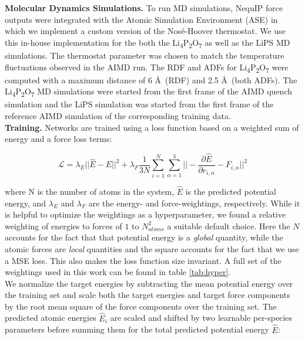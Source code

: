 \documentclass[11pt]{article}
\begin{document}
\textbf{Molecular Dynamics Simulations.} To run MD simulations, NequIP force outputs were integrated with the Atomic Simulation Environment (ASE) \cite{Hjorth_Larsen_2017} in which we implement a custom version of the Nosé-Hoover thermostat. We use this in-house implementation for the both the Li\textsubscript{4}P\textsubscript{2}O\textsubscript{7} as well as the LiPS MD simulations. The thermostat parameter was chosen to match the temperature fluctuations observed in the AIMD run. The RDF and ADFs for Li\textsubscript{4}P\textsubscript{2}O\textsubscript{7} were computed with a maximum distance of 6 \AA \ (RDF) and 2.5 \AA \ (both ADFs). The Li\textsubscript{4}P\textsubscript{2}O\textsubscript{7} MD simulations were started from the first frame of the AIMD quench simulation and the LiPS simulation was started from the first frame of the reference AIMD simulation of the corresponding training data.\\


\textbf{Training.} Networks are trained using a loss function based on a weighted sum of energy and a force loss terms:

\begin{equation}
    \mathcal{L} = \lambda_E || \hat{E} - E||^2 + \lambda_F \frac{1}{3N} \sum_{i=1}^{N} \sum_{\alpha=1}^3 || -\frac{\partial \hat{E}}{\partial r_{i, \alpha}}  - F_{i, \alpha}||^2
\end{equation}

where N is the number of atoms in the system, $\hat{E}$ is the predicted potential energy, and $\lambda_E$ and $\lambda_F$ are the energy- and force-weightings, respectively. While it is helpful to optimize the weightings as a hyperparameter, we found a relative weighting of energies to forces of $1$ to $N_{atoms}^2$ a suitable default choice. Here the $N$ accounts for the fact that that potential energy is a \emph{global} quantity, while the atomic forces are \emph{local} quantities and the square accounts for the fact that we use a MSE loss. This also makes the loss function size invariant. A full set of the weightings used in this work can be found in table \ref{tab:hyper}. \\ 

We normalize the target energies by subtracting the mean potential energy over the training set and scale both the target energies and target force components by the root mean square of the force components over the training set. The predicted atomic energies $\hat{E}_i$ are scaled and shifted by two learnable per-species parameters before summing them for the total predicted potential energy $\hat{E}$: 
\end{document}
